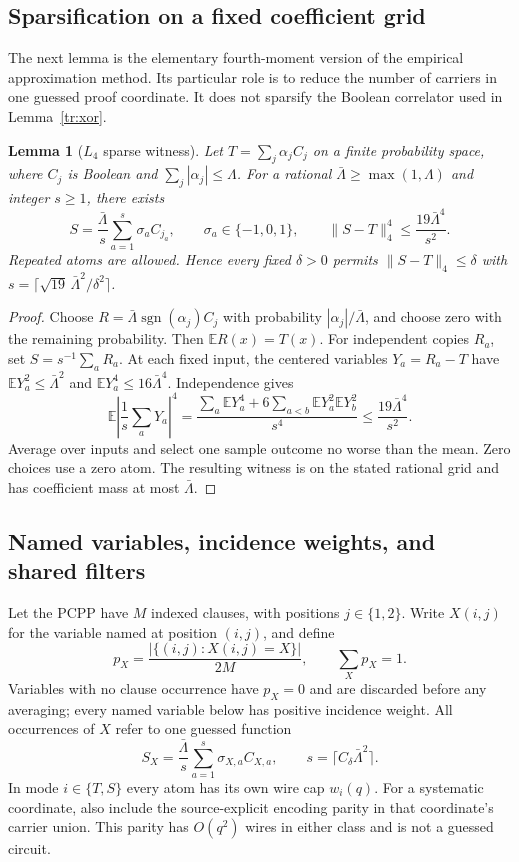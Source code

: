 \documentclass[11pt,letterpaper]{article}
\newtheorem{lemma}[theorem]{Lemma}
\theoremstyle{definition}
\theoremstyle{remark}
\begin{document}
\subsection{Sparsification on a fixed coefficient grid}
\label{tr:sparse-section}

The next lemma is the elementary fourth-moment version of the empirical
approximation method. Its particular role is to reduce the number of
carriers in one guessed proof coordinate. It does not sparsify the
Boolean correlator used in Lemma~\ref{tr:xor}.

\begin{lemma}[$L_4$ sparse witness]
\label{tr:sparse}
Let $T=\sum_j\alpha_j C_j$ on a finite probability space, where
$C_j$ is Boolean and $\sum_j|\alpha_j|\le\Lambda$. For a rational
$\bar\Lambda\ge\max(1,\Lambda)$ and integer $s\ge1$, there exists
\[
 S=\frac{\bar\Lambda}{s}\sum_{a=1}^s\sigma_a C_{j_a},
 \qquad \sigma_a\in\{-1,0,1\},
 \qquad \|S-T\|_4^4\le\frac{19\bar\Lambda^4}{s^2}.
\]
Repeated atoms are allowed. Hence every fixed $\delta>0$ permits
$\|S-T\|_4\le\delta$ with
$s=\lceil\sqrt{19}\,\bar\Lambda^2/\delta^2\rceil$.
\end{lemma}
\begin{proof}
Choose $R=\bar\Lambda\operatorname{sgn}(\alpha_j)C_j$ with
probability $|\alpha_j|/\bar\Lambda$, and choose zero with the
remaining probability. Then $\mathbb E R(x)=T(x)$.
For independent copies $R_a$, set $S=s^{-1}\sum_aR_a$.
At each fixed input, the centered variables $Y_a=R_a-T$ have
$\mathbb EY_a^2\le\bar\Lambda^2$ and
$\mathbb EY_a^4\le16\bar\Lambda^4$. Independence gives
\[
 \mathbb E\left|\frac1s\sum_aY_a\right|^4
 =\frac{\sum_a\mathbb EY_a^4+
 6\sum_{a<b}\mathbb EY_a^2\mathbb EY_b^2}{s^4}
 \le\frac{19\bar\Lambda^4}{s^2}.
\]
Average over inputs and select one sample outcome no worse than the
mean. Zero choices use a zero atom. The resulting witness is on the
stated rational grid and has coefficient mass at most $\bar\Lambda$.
\end{proof}

\subsection{Named variables, incidence weights, and shared filters}
\label{tr:masks}

Let the PCPP have $M$ indexed clauses, with positions $j\in\{1,2\}$.
Write $X(i,j)$ for the variable named at position $(i,j)$, and define
\[
 p_X=\frac{|\{(i,j):X(i,j)=X\}|}{2M},
 \qquad \sum_Xp_X=1.
\]
Variables with no clause occurrence have $p_X=0$ and are discarded
before any averaging; every named variable below has positive
incidence weight.
All occurrences of $X$ refer to one guessed function
\[
 S_X=\frac{\bar\Lambda}{s}
       \sum_{a=1}^s\sigma_{X,a}C_{X,a},
 \qquad s=\lceil C_\delta\bar\Lambda^2\rceil.
\]
In mode $i\in\{T,S\}$ every atom has its own wire cap $w_i(q)$.
For a systematic coordinate, also include the source-explicit
encoding parity in that coordinate's carrier union. This parity has
$O(q^2)$ wires in either class and is not a guessed circuit.
\end{document}
